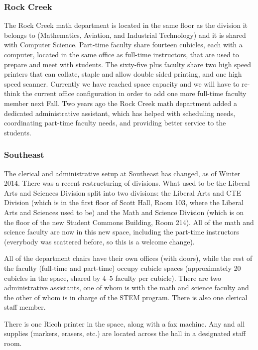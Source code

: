 \subsubsection{Rock Creek}
The Rock Creek math department is located in the same floor as the division it belongs to (Mathematics, Aviation, and Industrial Technology) and it is shared with Computer Science.   Part-time faculty share fourteen cubicles, each with a computer, located in the same office as full-time instructors, that are used to prepare and meet with students. The sixty-five plus faculty share two high speed printers that can collate, staple and allow double sided printing, and one high speed scanner. Currently we have reached space capacity and we will have to re-think the current office configuration in order to add one more full-time faculty member next Fall.  Two years ago the Rock Creek math department added a dedicated administrative assistant, which has helped with scheduling needs, coordinating part-time faculty needs, and providing better service to the students.  

\subsubsection{Southeast}
The clerical and administrative setup at Southeast has changed, as of Winter 2014. There was a recent restructuring of divisions. What used to be the Liberal Arts and Sciences Division split into two divisions: the Liberal Arts and CTE Division (which is in the first floor of Scott Hall, Room 103, where the Liberal Arts and Sciences used to be) and the Math and Science Division (which is on the  floor of the new Student Commons Building, Room 214). All of the math and science faculty are now in this new space, including the part-time instructors (everybody was scattered before, so this is a welcome change).

All of the department chairs have their own offices (with doors), while the rest of the faculty (full-time and part-time) occupy cubicle spaces (approximately 20 cubicles in the space, shared by 4--5 faculty per cubicle).  There are two administrative assistants, one of whom is with the math and science faculty and the other of whom is in charge of the STEM program.  There is also one clerical staff member.

There is one Ricoh printer in the space, along with a fax machine.  Any and all supplies (markers, erasers, etc.) are located across the hall in a designated staff room.

